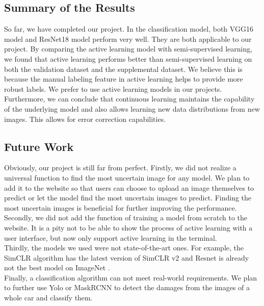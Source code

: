 \documentclass[lang=english,inputenc=utf8,fontsize=10pt]{ldvarticle}
\begin{document}
\subsection{Summary of the Results}
So far, we have completed our project. In the classification model, both VGG16 model and ResNet18 model perform very well. They are both applicable to our project. By comparing the active learning model with semi-supervised learning, we found that active learning performs better than semi-supervised learning on both the validation dataset and the supplemental dataset. We believe this is because the manual labeling feature in active learning helps to provide more robust labels. We prefer to use active learning models in our projects. Furthermore, we can conclude that continuous learning maintains the capability of the underlying model and also allows learning new data distributions from new images. This allows for error correction capabilities.



\subsection{Future Work}
Obviously, our project is still far from perfect. Firstly, we did not realize a universal function to find the most uncertain image for any model. We plan to add it to the website so that users can choose to upload an image themselves to predict or let the model find the most uncertain images to predict. Finding the most uncertain images is beneficial for further improving the performance.\\

Secondly, we did not add the function of training a model from scratch to the website. It is a pity not to be able to show the process of active learning with a user interface, but now only support active learning in the terminal.\\

Thirdly, the models we used were not state-of-the-art ones. For example, the SimCLR algorithm has the latest version of SimCLR v2 and Resnet is already not the best model on ImageNet \cite{ref1}.\\

Finally, a classification algorithm can not meet real-world requirements. We plan to further use Yolo or MaskRCNN to detect the damages from the images of a whole car and classify them.\\



\newpage
\end{document}
